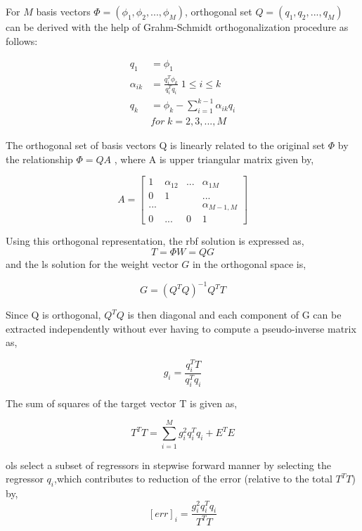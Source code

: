 For $M$ basis vectors $\Phi=(\phi_1,\phi_2,...,\phi_M)$, orthogonal set $Q=(q_1,q_2,...,q_M)$ can be derived with the help of Grahm-Schmidt orthogonalization procedure as follows:

\begin{align}
q_1&=\phi_1 \label{q1} \\
\alpha_{ik}&=\frac{q^T_i\phi_k}{q^T_iq_i} \; 1\le i \le k \label{alpha_ik}\\
q_k&=\phi_k-\sum\limits_{i=1}^{k-1}\alpha_{ik}q_i \label{qk}\\
& for \; k=2,3,...,M \nonumber
\end{align}

The orthogonal set of basis vectors Q is linearly related to the original set $\Phi$ by the relationship $ \Phi=QA \label{orthogonal_representation}$ \cite{Chen1991}, where A is upper triangular matrix given by,

\begin{equation}
A=
\begin{bmatrix}
1&\alpha_{12}&...&\alpha_{1M}\\
0&1&&...\\
...&&&\alpha_{M-1,M}\\
0&...&0&1
\end{bmatrix}
\end{equation}

Using this orthogonal representation, the \ac{rbf} solution is expressed as,
\begin{equation}
T=\Phi W= QG
\end{equation}
and the \ac{ls} solution for the weight vector $G$ in the orthogonal space is,

\begin{equation}
G=(Q^TQ)^{-1}Q^TT
\end{equation}

Since Q is orthogonal, $Q^TQ$ is then diagonal and each component of G can be extracted independently without ever having to compute a pseudo-inverse matrix as,

\begin{equation}\label{ols_pseudo_inverse}
g_i=\frac{q^T_iT}{q^T_iq_i}
\end{equation}

The sum of squares of the target vector T is given as,

\begin{equation}
T^TT=\sum\limits_{i=1}^{M}g^2_iq^T_iq_i+E^TE
\end{equation}

\ac{ols} select a subset of regressors in stepwise forward manner by selecting the regressor $q_i$,which contributes to reduction of the error (relative to the total $T^TT$) by,
\begin{equation}\label{ols_error}
[err]_i=\frac{g^2_iq^T_iq_i}{T^TT}
\end{equation}

